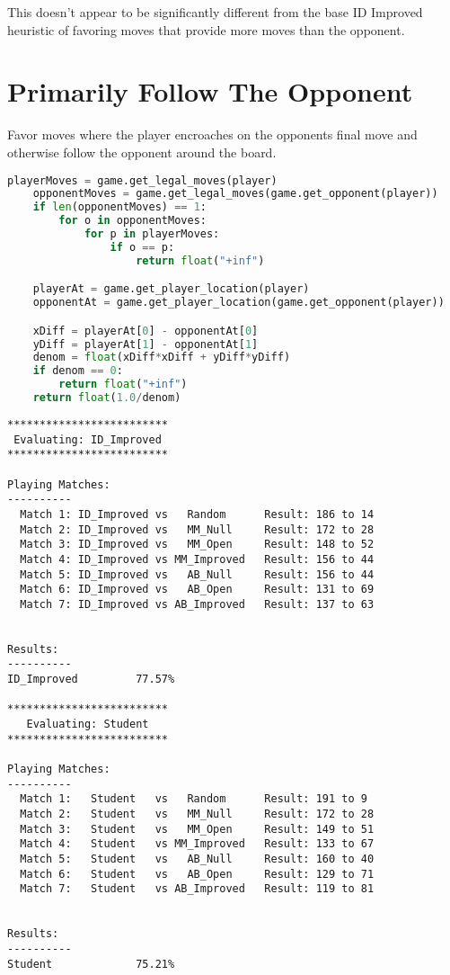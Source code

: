 \documentclass[10pt, a4paper]{article}
\begin{document}
This doesn't appear to be significantly different from the base ID Improved heuristic 
of favoring moves that provide more moves than the opponent.

\section{Primarily Follow The Opponent}

Favor moves where the player encroaches on the opponents final move and otherwise
follow the opponent around the board.

\begin{lstlisting}[language=Python]
    playerMoves = game.get_legal_moves(player)
    opponentMoves = game.get_legal_moves(game.get_opponent(player))
    if len(opponentMoves) == 1:
        for o in opponentMoves:
            for p in playerMoves:
                if o == p:
                    return float("+inf")

    playerAt = game.get_player_location(player)
    opponentAt = game.get_player_location(game.get_opponent(player))

    xDiff = playerAt[0] - opponentAt[0]
    yDiff = playerAt[1] - opponentAt[1]
    denom = float(xDiff*xDiff + yDiff*yDiff)
    if denom == 0:
        return float("+inf")
    return float(1.0/denom)
\end{lstlisting}

\begin{verbatim}
*************************
 Evaluating: ID_Improved 
*************************

Playing Matches:
----------
  Match 1: ID_Improved vs   Random    	Result: 186 to 14
  Match 2: ID_Improved vs   MM_Null   	Result: 172 to 28
  Match 3: ID_Improved vs   MM_Open   	Result: 148 to 52
  Match 4: ID_Improved vs MM_Improved 	Result: 156 to 44
  Match 5: ID_Improved vs   AB_Null   	Result: 156 to 44
  Match 6: ID_Improved vs   AB_Open   	Result: 131 to 69
  Match 7: ID_Improved vs AB_Improved 	Result: 137 to 63


Results:
----------
ID_Improved         77.57%

*************************
   Evaluating: Student   
*************************

Playing Matches:
----------
  Match 1:   Student   vs   Random    	Result: 191 to 9
  Match 2:   Student   vs   MM_Null   	Result: 172 to 28
  Match 3:   Student   vs   MM_Open   	Result: 149 to 51
  Match 4:   Student   vs MM_Improved 	Result: 133 to 67
  Match 5:   Student   vs   AB_Null   	Result: 160 to 40
  Match 6:   Student   vs   AB_Open   	Result: 129 to 71
  Match 7:   Student   vs AB_Improved 	Result: 119 to 81


Results:
----------
Student             75.21%
\end{verbatim}
\end{document}
